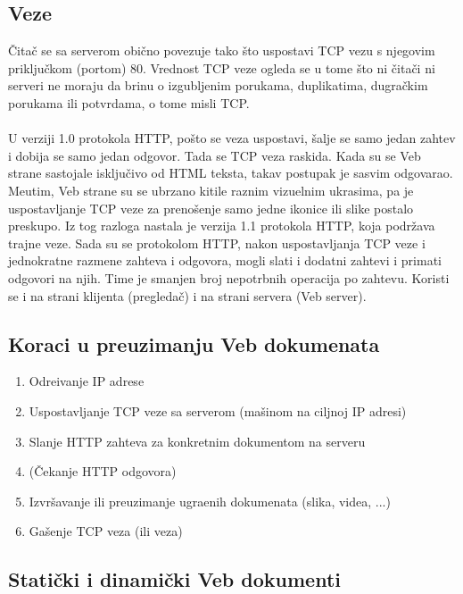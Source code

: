 \documentclass{article} %
\begin{document}
\subsection{Veze}

\v Cita\v c se sa serverom obi\v cno povezuje tako \v sto uspostavi TCP vezu s njegovim priklju\v ckom (portom) 80.  Vrednost TCP veze ogleda se u tome \v sto ni \v cita\v ci ni serveri ne moraju da brinu o izgubljenim porukama, duplikatima, dugra\v ckim porukama ili potvrdama, o tome misli TCP.
\\
\\ U verziji 1.0 protokola HTTP, po\v sto se veza uspostavi, \v salje se samo jedan zahtev i dobija se samo jedan odgovor. Tada se TCP veza raskida. Kada su se Veb strane sastojale isklju\v civo od HTML teksta, takav postupak je sasvim odgovarao. Me\dj utim, Veb strane su se ubrzano kitile raznim vizuelnim ukrasima, pa je uspostavljanje TCP veze za preno\v senje samo jedne ikonice ili slike postalo preskupo. Iz tog razloga nastala je verzija 1.1 protokola HTTP, koja podr\v zava trajne veze. Sada su se protokolom HTTP, nakon uspostavljanja TCP veze i jednokratne razmene zahteva i odgovora, mogli slati i dodatni zahtevi i primati odgovori na njih. Time je smanjen broj nepotrbnih operacija po zahtevu. Koristi se i na strani klijenta (pregleda\v c) i na strani servera (Veb server).

\subsection{Koraci u preuzimanju Veb dokumenata}

\begin{enumerate}
	\item Odre\dj ivanje IP adrese
	\item Uspostavljanje TCP veze sa serverom (ma\v sinom na ciljnoj IP adresi)
	\item Slanje HTTP zahteva za konkretnim dokumentom na serveru
	\item (\v Cekanje HTTP odgovora)
	\item Izvr\v savanje ili preuzimanje ugra\dj enih dokumenata (slika, videa, ...)
	\item Ga\v senje TCP veza (ili veza)
\end{enumerate}


\subsection{Stati\v cki i dinami\v cki Veb dokumenti}
\end{document}
